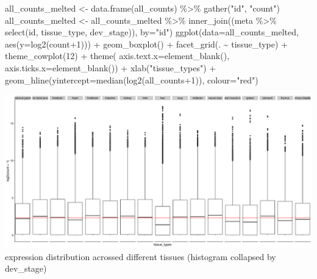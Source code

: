 \documentclass[
]{article}
\newenvironment{Shaded}{\begin{snugshade}}{\end{snugshade}}
\newcommand{\AttributeTok}[1]{\textcolor[rgb]{0.77,0.63,0.00}{#1}}
\newcommand{\DecValTok}[1]{\textcolor[rgb]{0.00,0.00,0.81}{#1}}
\newcommand{\FunctionTok}[1]{\textcolor[rgb]{0.00,0.00,0.00}{#1}}
\newcommand{\NormalTok}[1]{#1}
\newcommand{\OtherTok}[1]{\textcolor[rgb]{0.56,0.35,0.01}{#1}}
\newcommand{\SpecialCharTok}[1]{\textcolor[rgb]{0.00,0.00,0.00}{#1}}
\newcommand{\StringTok}[1]{\textcolor[rgb]{0.31,0.60,0.02}{#1}}
\begin{document}
\begin{Shaded}
\begin{Highlighting}[]
\NormalTok{all\_counts\_melted }\OtherTok{\textless{}{-}} \FunctionTok{data.frame}\NormalTok{(all\_counts) }\SpecialCharTok{\%\textgreater{}\%} \FunctionTok{gather}\NormalTok{(}\StringTok{"id"}\NormalTok{, }\StringTok{"count"}\NormalTok{)}
\NormalTok{all\_counts\_melted }\OtherTok{\textless{}{-}}\NormalTok{ all\_counts\_melted }\SpecialCharTok{\%\textgreater{}\%} \FunctionTok{inner\_join}\NormalTok{((meta }\SpecialCharTok{\%\textgreater{}\%} \FunctionTok{select}\NormalTok{(id, tissue\_type, dev\_stage)), }\AttributeTok{by=}\StringTok{"id"}\NormalTok{)}
  \FunctionTok{ggplot}\NormalTok{(}\AttributeTok{data=}\NormalTok{all\_counts\_melted, }\FunctionTok{aes}\NormalTok{(}\AttributeTok{y=}\FunctionTok{log2}\NormalTok{(count}\SpecialCharTok{+}\DecValTok{1}\NormalTok{))) }\SpecialCharTok{+} \FunctionTok{geom\_boxplot}\NormalTok{() }\SpecialCharTok{+}  \FunctionTok{facet\_grid}\NormalTok{(. }\SpecialCharTok{\textasciitilde{}}\NormalTok{ tissue\_type) }\SpecialCharTok{+} \FunctionTok{theme\_cowplot}\NormalTok{(}\DecValTok{12}\NormalTok{) }\SpecialCharTok{+} \FunctionTok{theme}\NormalTok{(}
        \AttributeTok{axis.text.x=}\FunctionTok{element\_blank}\NormalTok{(),}
        \AttributeTok{axis.ticks.x=}\FunctionTok{element\_blank}\NormalTok{()) }\SpecialCharTok{+} \FunctionTok{xlab}\NormalTok{(}\StringTok{"tissue\_types"}\NormalTok{) }\SpecialCharTok{+} \FunctionTok{geom\_hline}\NormalTok{(}\AttributeTok{yintercept=}\FunctionTok{median}\NormalTok{(}\FunctionTok{log2}\NormalTok{(all\_counts}\SpecialCharTok{+}\DecValTok{1}\NormalTok{)), }\AttributeTok{colour=}\StringTok{"red"}\NormalTok{)}
\end{Highlighting}
\end{Shaded}

\includegraphics{Exploration_files/figure-latex/unnamed-chunk-12-1.pdf}
expression distribution acrossed different tissues (histogram collapsed
by dev\_stage)
\end{document}
